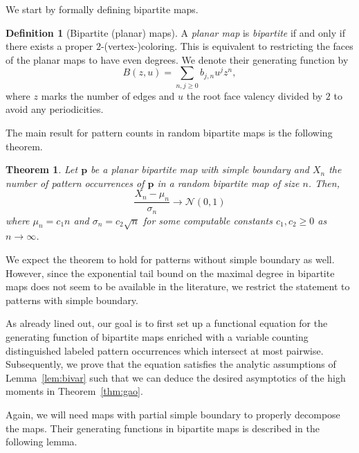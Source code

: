 \documentclass[reqno, 11pt]{amsart}
\newtheorem{theorem}{Theorem}
\theoremstyle{definition}
\newtheorem{definition}{Definition}
\theoremstyle{remark}
\newcommand{\map}[1]{\textbf{#1}}
\numberwithin{equation}{section}
\begin{document}
We start by formally defining bipartite maps.
\begin{definition}[Bipartite (planar) maps]
    A \emph{planar map} is  \emph{bipartite} if and only if there exists a proper $2$-(vertex-)coloring. This is equivalent to restricting the faces of the planar maps to have even degrees. We denote their generating function by
        \[
            B(z,u) = \sum_{n,j\geq 0} b_{j,n}u^jz^n,
        \]
    where $z$ marks the number of edges and $u$ the root face valency divided by $2$ to avoid any periodicities.
\end{definition}

The main result for pattern counts in random bipartite maps is the following theorem.

\begin{theorem}\label{thm:bipartite}
    Let $\map{p}$ be a planar bipartite map with simple boundary and $X_n$ the number of pattern occurrences of $\map{p}$ in a random bipartite map of size $n$. Then,
    \[
        \frac{X_n-\mu_n}{\sigma_n} \rightarrow \mathcal{N}(0,1)
    \]
    where $\mu_n = c_1n$ and $\sigma_n = c_2\sqrt{n}$ for some computable constants $c_1,c_2 \geq 0$ as $n\rightarrow \infty$.
\end{theorem}

We expect the theorem to hold for patterns without simple boundary as well. However, since the exponential tail bound on the maximal degree in bipartite maps does not seem to be available in the literature, we restrict the statement to patterns with simple boundary. 

As already lined out, our goal is to first set up a functional equation for the generating function of bipartite maps enriched with a variable counting distinguished labeled pattern occurrences which intersect at most pairwise. Subsequently, we prove that the equation satisfies the analytic assumptions of Lemma~\ref{lem:bivar} such that we can deduce the desired asymptotics of the high moments in Theorem~\ref{thm:gao}.

Again, we will need maps with partial simple boundary to properly decompose the maps. Their generating functions in bipartite maps is described in the following lemma. 
\end{document}
